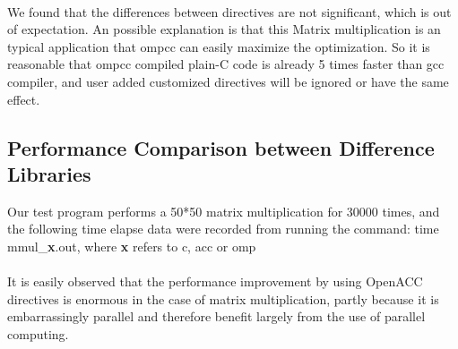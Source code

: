 \documentclass[ebook,10pt,oneside,openany]{memoir}
\begin{document}
\\
We found that the differences between directives are not significant, which is out of expectation. An possible explanation is that this Matrix multiplication is an typical application that ompcc can easily maximize the optimization. So it is reasonable that ompcc compiled plain-C code is already 5 times faster than gcc compiler, and user added customized directives will be ignored or have the same effect.


\subsection{Performance Comparison between Difference Libraries}
Our test program performs a 50*50 matrix multiplication for 30000 times, and the following time elapse data were recorded from running the command: time mmul\_\textbf{x}.out, where \textbf{x} refers to c, acc or omp \\


\paragraph{}
It is easily observed that the performance improvement by using OpenACC directives is enormous in the case of matrix multiplication, partly because it is embarrassingly parallel and therefore benefit largely from the use of parallel computing. \\
\end{document}
